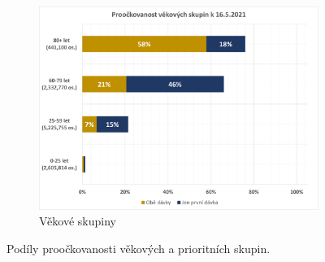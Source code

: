 \begin{figure}
\begin{subfigure}{0.9\textwidth}
\includegraphics[height=0.3\textheight, width=\textwidth]{assets/proockovanost_veksk}
\caption{Věkové skupiny}
\label{proockovanost_vek}
\end{subfigure}



\caption{Podíly proočkovanosti věkových a prioritních skupin.}
\label{proockovanost_podily}

\end{figure}



